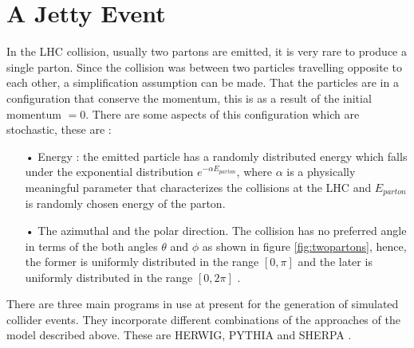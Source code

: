 \section{A Jetty Event}
In the LHC collision, usually two partons are emitted, it is very rare to produce a single parton. Since the collision was between two particles travelling opposite to each other, a simplification assumption can be made. That the particles are in a configuration that conserve the momentum, this is as a result of the initial momentum $= 0$. There are some aspects of this configuration which are stochastic, these are :
\begin{itemize}
\item[•]
Energy : the emitted particle has a randomly distributed  energy which falls under the exponential distribution $e^{- \alpha E_{parton}}$, where $\alpha$ is a physically meaningful parameter that characterizes the collisions at the LHC and $E_{parton}$ is randomly chosen energy of the parton. 
\item[•]
The azimuthal and the polar direction. The collision has no preferred angle in terms of the both angles $\theta$ and $\phi$ as shown in figure \ref{fig:twopartons}, hence, the former is uniformly distributed in the range $[0, \pi]$ and the later is uniformly distributed in the range $[0,2 \pi]$ \citep{Salam:2010zt}.    
\end{itemize}

There are three main programs in use at present for the generation of simulated collider events. They incorporate different combinations of the approaches of the model described above. These are HERWIG, PYTHIA and SHERPA \citep{Buckley:2011ms}.      